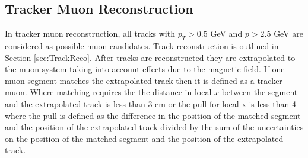 \subsection{Tracker Muon Reconstruction}
In tracker muon reconstruction, all tracks with $p_{T}>0.5$ GeV
and $p>2.5$ GeV are considered as possible muon candidates. 
Track reconstruction is outlined in Section \ref{sec:TrackReco}.
After tracks are reconstructed they are extrapolated to the muon
system taking into account effects due to the magnetic field.
If one muon segment matches the extrapolated track then 
it is defined as a tracker muon.  Where matching requires
the the distance in local $x$ between the segment and the extrapolated
track is less than 3 cm or the pull for local x is less than 4 where
the pull is defined as the difference in the position of the matched segment
and the position of the extrapolated track divided by the sum of 
the uncertainties on the position of the matched segment
and the position of the extrapolated track.
